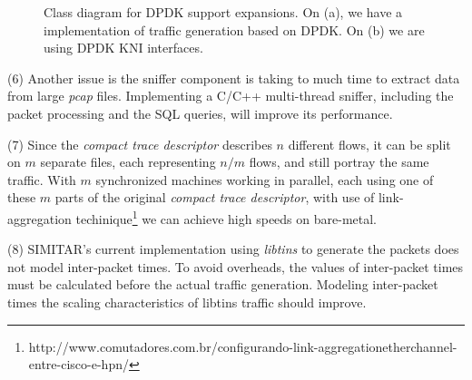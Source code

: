 \begin{figure}[h!]
    \centering
    \hspace{0mm}
    \caption{Class diagram for DPDK support expansions. On (a), we have a implementation of traffic generation based on DPDK. On (b) we are using DPDK KNI interfaces.}
    \label{fig:DpdkFlow}
\end{figure}

(6) Another issue is the sniffer component is taking to much time to extract data from large \textit{pcap} files. Implementing a C/C++ multi-thread sniffer, including the packet processing and the SQL queries, will improve its performance. 


(7) Since the \textit{compact trace descriptor} describes $n$ different flows, it can be split on $m$ separate files, each representing $n/m$ flows, and still portray the same traffic. With $m$ synchronized machines working in parallel, each using one of these $m$ parts of the original \textit{compact trace descriptor}, with use of link-aggregation techinique\footnote{http://www.comutadores.com.br/configurando-link-aggregationetherchannel-entre-cisco-e-hpn/} we can achieve high speeds on bare-metal. 

(8) SIMITAR's current implementation using \textit{libtins} to generate the packets does not model inter-packet times. To avoid overheads,  the values of inter-packet times must be calculated before the actual traffic generation. Modeling inter-packet times the scaling characteristics of libtins traffic should improve. 


